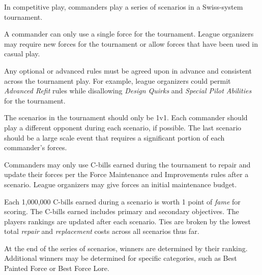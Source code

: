 In competitive play, commanders play a series of scenarios in a Swiss-system tournament.

A commander can only use a single force for the tournament.
League organizers may require new forces for the tournament or allow forces that have been used in casual play.

Any optional or advanced rules must be agreed upon in advance and consistent across the tournament play.
For example, league organizers could permit \emph{Advanced Refit} rules while disallowing \emph{Design Quirks} and \emph{Special Pilot Abilities} for the tournament.

The scenarios in the tournament should only be 1v1.
Each commander should play a different opponent during each scenario, if possible.
The last scenario should be a large scale event that requires a significant portion of each commander's forces.

Commanders may only use C-bills earned during the tournament to repair and update their forces per the Force Maintenance and Improvements rules after a scenario.
League organizers may give forces an initial maintenance budget.

Each 1,000,000 C-bills earned during a scenario is worth 1 point of \emph{fame} for scoring.
The C-bills earned includes primary and secondary objectives.
The players rankings are updated after each scenario.
Ties are broken by the lowest total \emph{repair} and \emph{replacement} costs across all scenarios thus far.

At the end of the series of scenarios, winners are determined by their ranking.
Additional winners may be determined for specific categories, such as Best Painted Force or Best Force Lore.
